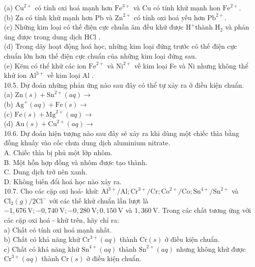 \documentclass[10pt]{article}
\begin{document}
(a) $\mathrm{Cu}^{2+}$ có tính oxi hoá mạnh hơn $\mathrm{Fe}^{3+}$ và Cu có tính khử mạnh hon $\mathrm{Fe}^{2+}$.\\
(b) Zn có tính khử mạnh hơn Pb và $\mathrm{Zn}^{2+}$ có tính oxi hoá yếu hơn $\mathrm{Pb}^{2+}$.\\
(c) Những kim loại có thế điện cực chuần âm đều khử được $\mathrm{H}^{+}$thành $\mathrm{H}_{2}$ và phản úng được trong dung dịch HCl .\\
(d) Trong dãy hoạt động hoá học, những kim loại đứng trước có thế điện cực chuẩn lớn hơn thế điện cực chuẩn của những kim loại đứng sau.\\
(e) Kẽm có thể khử các ion $\mathrm{Fe}^{2+}$ và $\mathrm{Ni}^{2+}$ về kim loại Fe và Ni nhưng không thể khử ion $\mathrm{Al}^{3+}$ về kim loại Al .\\
10.5. Dự đoán những phản ứng nào sau đây có thể tự xảy ra ở điều kiện chuẩn.\\
(a) $\mathrm{Zn}(s)+\mathrm{Sn}^{2+}(a q) \rightarrow$\\
(b) $\mathrm{Ag}^{+}(a q)+\mathrm{Fe}(s) \rightarrow$\\
(c) $\mathrm{Fe}(s)+\mathrm{Mg}^{2+}(a q) \rightarrow$\\
(d) $\mathrm{Au}(s)+\mathrm{Cu}^{2+}(a q) \rightarrow$\\
10.6. Dự đoán hiện tượng nào sau đây sẽ xảy ra khi dùng một chiếc thìa bằng đồng khuấy vào cốc chưa dung dịch aluminium nitrate.\\
A. Chiếc thìa bị phủ một lớp nhôm.\\
B. Một hỗn hợp đồng và nhôm được tạo thành.\\
C. Dung dịch trở nên xanh.\\
D. Không biến đổi hoá học nào xảy ra.\\
10.7. Cho các cặp oxi hoá- khử: $\mathrm{Al}^{3+} / \mathrm{Al} ; \mathrm{Cr}^{3+} / \mathrm{Cr} ; \mathrm{Co}^{2+} / \mathrm{Co} ; \mathrm{Sn}^{4+} / \mathrm{Sn}^{2+}$ và $\mathrm{Cl}_{2}(g) / 2 \mathrm{Cl}^{-}$ với các thế khử chuẩn lần lượt là $-1,676 \mathrm{~V} ;-0,740 \mathrm{~V} ;-0,280 \mathrm{~V} ; 0,150 \mathrm{~V}$ và $1,360 \mathrm{~V}$. Trong các chất tương ứng với các cặp oxi hoá - khử trên, hãy chỉ ra:\\
a) Chất có tính oxi hoá mạnh nhất.\\
b) Chất có khả năng khử $\mathrm{Cr}^{3+}(a q)$ thành $\mathrm{Cr}(s)$ ở điều kiện chuẩn.\\
c) Chất có khả năng khử $\mathrm{Sn}^{4+}(a q)$ thành $\mathrm{Sn}^{2+}(a q)$ nhưng không khử được $\mathrm{Cr}^{3+}(a q)$ thành $\mathrm{Cr}(s)$ ở điều kiện chuẩn.\\
\end{document}
